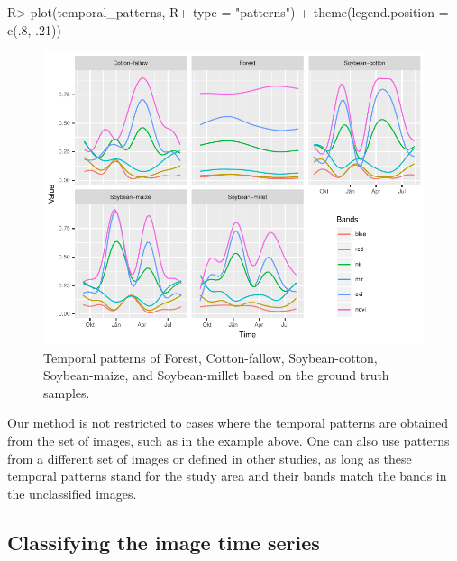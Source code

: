 \documentclass[article,shortnames]{jss}
\begin{document}
\begin{CodeChunk}

\begin{CodeInput}
R> plot(temporal_patterns, 
R+   type = "patterns") + theme(legend.position = c(.8, .21))
\end{CodeInput}
\begin{figure}[!h]

{\centering \includegraphics{dtwSat_files/figure-latex/temporal-patterns-1} 

}

\caption[Temporal patterns of Forest, Cotton-fallow, Soybean-cotton, Soybean-maize, and Soybean-millet based on the ground truth samples]{Temporal patterns of Forest, Cotton-fallow, Soybean-cotton, Soybean-maize, and Soybean-millet based on the ground truth samples.}\label{fig:temporal-patterns}
\end{figure}
\end{CodeChunk}

Our method is not restricted to cases where the temporal patterns are
obtained from the set of images, such as in the example above. One can
also use patterns from a different set of images or defined in other
studies, as long as these temporal patterns stand for the study area and
their bands match the bands in the unclassified images.

\hypertarget{classifying-the-image-time-series}{%
\subsection{Classifying the image time
series}\label{classifying-the-image-time-series}}
\end{document}

